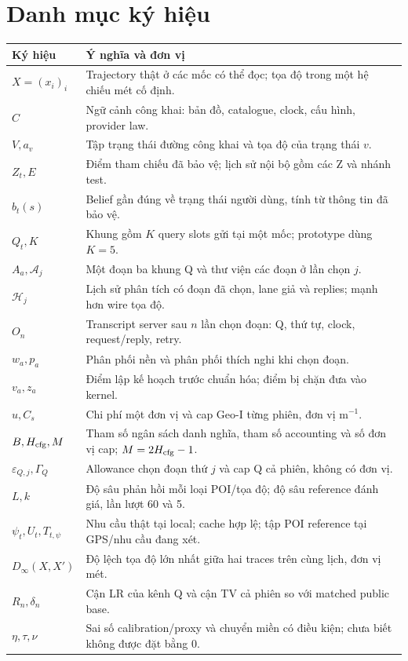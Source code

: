 \chapter*{Danh mục ký hiệu}
\begin{small}
\begin{longtable}{@{}P{2.5cm}P{13cm}@{}}
\textbf{Ký hiệu} & \textbf{Ý nghĩa và đơn vị}\\\midrule
$X=(x_i)_i$ & Trajectory thật ở các mốc có thể đọc; tọa độ trong một hệ chiếu mét cố định.\\
$C$ & Ngữ cảnh công khai: bản đồ, catalogue, clock, cấu hình, provider law.\\
$V,a_v$ & Tập trạng thái đường công khai và tọa độ của trạng thái $v$.\\
$Z_t,E$ & Điểm tham chiếu đã bảo vệ; lịch sử nội bộ gồm các Z và nhánh test.\\
$b_t(s)$ & Belief gần đúng về trạng thái người dùng, tính từ thông tin đã bảo vệ.\\
$Q_t,K$ & Khung gồm $K$ query slots gửi tại một mốc; prototype dùng $K=5$.\\
$A_a,\mathcal A_j$ & Một đoạn ba khung Q và thư viện các đoạn ở lần chọn $j$.\\
$\mathcal H_j$ & Lịch sử phân tích có đoạn đã chọn, lane giả và replies; mạnh hơn wire tọa độ.\\
$O_n$ & Transcript server sau $n$ lần chọn đoạn: Q, thứ tự, clock, request/reply, retry.\\
$w_a,p_a$ & Phân phối nền và phân phối thích nghi khi chọn đoạn.\\
$v_a,z_a$ & Điểm lập kế hoạch trước chuẩn hóa; điểm bị chặn đưa vào kernel.\\
$u,C_s$ & Chi phí một đơn vị và cap Geo-I từng phiên, đơn vị m$^{-1}$.\\
$B,H_{\rm cfg},M$ & Tham số ngân sách danh nghĩa, tham số accounting và số đơn vị cap; $M=2H_{\rm cfg}-1$.\\
$\varepsilon_{Q,j},\Gamma_Q$ & Allowance chọn đoạn thứ $j$ và cap Q cả phiên, không có đơn vị.\\
$L,k$ & Độ sâu phản hồi mỗi loại POI/tọa độ; độ sâu reference đánh giá, lần lượt 60 và 5.\\
$\psi_t,U_t,T_{t,\psi}$ & Nhu cầu thật tại local; cache hợp lệ; tập POI reference tại GPS/nhu cầu đang xét.\\
$D_\infty(X,X')$ & Độ lệch tọa độ lớn nhất giữa hai traces trên cùng lịch, đơn vị mét.\\
$R_n,\delta_n$ & Cận LR của kênh Q và cận TV cả phiên so với matched public base.\\
$\eta,\tau,\nu$ & Sai số calibration/proxy và chuyển miền có điều kiện; chưa biết không được đặt bằng 0.\\
\end{longtable}\end{small}
